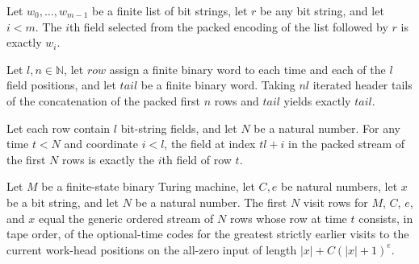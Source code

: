 \begin{lemma}
\label{Complexity.clA5Field_fields}
\leanok
{}
Let $w_0,\ldots,w_{m-1}$ be a finite list of bit strings, let $r$ be any bit string, and
let $i<m$. The $i$th field selected from the packed encoding of the list followed by $r$
is exactly $w_i$.
\end{lemma}

\begin{lemma}
\label{Complexity.clA5Tail_rows}
\leanok
{}
Let $l,n\in\mathbb{N}$, let $row$ assign a finite binary word to each time and each of
the $l$ field positions, and let $tail$ be a finite binary word. Taking $n l$ iterated
header tails of the concatenation of the packed first $n$ rows and $tail$ yields exactly
$tail$.
\end{lemma}

\begin{lemma}
\label{Complexity.clA5Field_rows}
\leanok
{}
Let each row contain $l$ bit-string fields, and let $N$ be a natural number. For any
time $t<N$ and coordinate $i<l$, the field at index $tl+i$ in the packed stream of the
first $N$ rows is exactly the $i$th field of row $t$.
\end{lemma}

\begin{lemma}
\label{Complexity.clA5Visits_rows}
\leanok
{}
Let $M$ be a finite-state binary Turing machine, let $C,e$ be natural numbers, let $x$
be a bit string, and let $N$ be a natural number. The first $N$ visit rows for $M$, $C$,
$e$, and $x$ equal the generic ordered stream of $N$ rows whose row at time $t$
consists, in tape order, of the optional-time codes for the greatest strictly earlier
visits to the current work-head positions on the all-zero input of length
$|x|+C(|x|+1)^e$.
\end{lemma}

